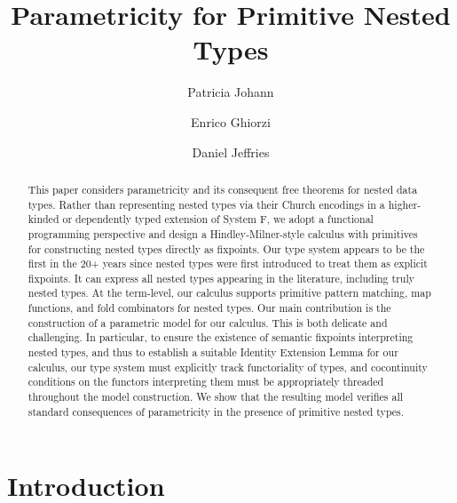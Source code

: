 \documentclass[runningheads]{llncs}
\begin{document}

\title{Parametricity for Primitive Nested Types\vspace*{-0.2in}} 
\author{Patricia Johann \and Enrico Ghiorzi
\and Daniel Jeffries \vspace*{-0.12in}} 

\maketitle

\begin{abstract}

\vspace*{-0.25in}

This paper considers parametricity and its consequent free theorems
for nested data types. Rather than representing nested types via their
Church encodings in a higher-kinded or dependently typed extension of
System F, we adopt a functional programming perspective and design a
Hindley-Milner-style calculus with primitives for constructing nested
types directly as fixpoints. Our type system appears to be the first
in the 20+ years since nested types were first introduced to treat
them as explicit fixpoints. It can express all nested types appearing
in the literature, including truly nested types. At the term-level,
our calculus supports primitive pattern matching, map functions, and
fold combinators for nested types. Our main contribution is the
construction of a parametric model for our calculus. This is both
delicate and challenging. In particular, to ensure the existence of
semantic fixpoints interpreting nested types, and thus to establish a
suitable Identity Extension Lemma for our calculus, our type system
must explicitly track functoriality of types, and cocontinuity
conditions on the functors interpreting them must be appropriately
threaded throughout the model construction. We show that the
resulting model verifies all standard consequences of parametricity in
the presence of primitive nested types.
\end{abstract}

\vspace*{-0.4in}

\section{Introduction}\label{sec:intro}
\end{document}
